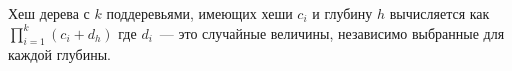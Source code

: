 Хеш дерева с $k$ поддеревьями, имеющих хеши $c_i$ и глубину $h$ вычисляется как $\prod_{i = 1}^{k} (c_i + d_h)$ где $d_i$~--- это случайные величины, независимо выбранные для каждой глубины.
